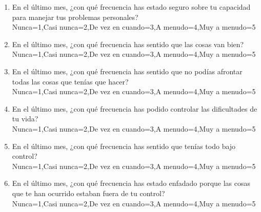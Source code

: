\documentclass{article}
\begin{document}
{\begin{Form}
\begin{enumerate}
        \item En el último mes, ¿con qué frecuencia has estado seguro sobre tu capacidad para manejar tus problemas personales?\\
              \ChoiceMenu[radio, name=respuesta06, radiosymbol=\ding{108}]{}
              {Nunca=1,Casi nunca=2,De vez en cuando=3,A menudo=4,Muy a menudo=5}\\

        \item En el último mes, ¿con qué frecuencia has sentido que las cosas van bien?\\
              \ChoiceMenu[radio, name=respuesta07, radiosymbol=\ding{108}]{}
              {Nunca=1,Casi nunca=2,De vez en cuando=3,A menudo=4,Muy a menudo=5}\\

        \item En el último mes, ¿con qué frecuencia has sentido que no podías afrontar todas las cosas que tenías que hacer?\\
              \ChoiceMenu[radio, name=respuesta08, radiosymbol=\ding{108}]{}
              {Nunca=1,Casi nunca=2,De vez en cuando=3,A menudo=4,Muy a menudo=5}\\

        \item En el último mes, ¿con qué frecuencia has podido controlar las dificultades de tu vida?\\
              \ChoiceMenu[radio, name=respuesta09, radiosymbol=\ding{108}]{}
              {Nunca=1,Casi nunca=2,De vez en cuando=3,A menudo=4,Muy a menudo=5}\\

        \item En el último mes, ¿con qué frecuencia has sentido que tenías todo bajo control?\\
              \ChoiceMenu[radio, name=respuesta10, radiosymbol=\ding{108}]{}
              {Nunca=1,Casi nunca=2,De vez en cuando=3,A menudo=4,Muy a menudo=5}\\

        \item En el último mes, ¿con qué  frecuencia has estado enfadado porque las cosas que te han ocurrido estaban fuera de tu control?\\
              \ChoiceMenu[radio, name=respuesta11, radiosymbol=\ding{108}]{}
              {Nunca=1,Casi nunca=2,De vez en cuando=3,A menudo=4,Muy a menudo=5}\\


\end{enumerate}
\end{Form}}
\end{document}
